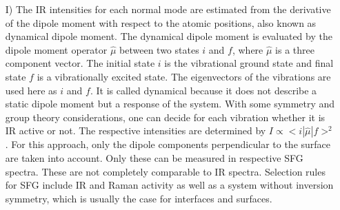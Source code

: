 \documentclass[11pt,DIV=13,BCOR=5mm,a4paper,headinclude]{scrbook}
\begin{document}
\begin{itemize}
 \item[I)] The IR intensities for each normal mode are estimated from the derivative of the dipole moment with respect to the atomic positions, also known as dynamical dipole moment\cite{dyn-dip}.
The dynamical dipole moment is evaluated by the dipole moment operator $\hat{\mu}$ between two states $i$ and $f$, where $\hat{\mu}$ is a three component vector.
The initial state $i$ is the vibrational ground state and final state $f$ is a vibrationally excited state.
The eigenvectors of the vibrations are used here as $i$ and $f$.
It is called dynamical because it does not describe a static dipole moment but a response of the system.
With some symmetry and group theory considerations, one can decide for each vibration whether it is IR active or not.
The respective intensities are determined by $I\propto <i|\hat{\mu}|f>^2$.
For this approach, only the dipole components perpendicular to the surface are taken into account.
Only these can be measured in respective SFG spectra.
These are not completely comparable to IR spectra.
Selection rules for SFG include IR and Raman activity as well as a system without inversion symmetry, which is usually the case for interfaces and surfaces.
  

\end{itemize}
\end{document}
